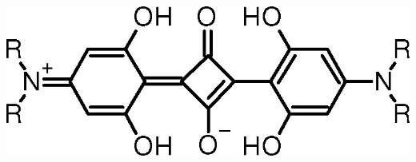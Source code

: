 \documentclass{article}
\newenvironment{Figure}
  {\par\medskip\noindent\minipage{\linewidth}}
  {\endminipage\par\medskip}
\begin{document}
\begin{multicols}{2}
\begin{Figure}
\centering
\includegraphics[width = \linewidth]{images/nAlinoSquaraine.jpeg}
\label{SQstructureBasic}
\end{Figure}


\printbibliography
\end{multicols}
\end{document}
